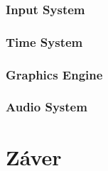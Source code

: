 \documentclass[10pt,twoside,slovak,a4paper,hidelinks]{article}
\begin{document}
\subsubsection{Input System}
\subsubsection{Time System}
\subsubsection{Graphics Engine}
\subsubsection{Audio System}
\section{Záver}






\end{document}
